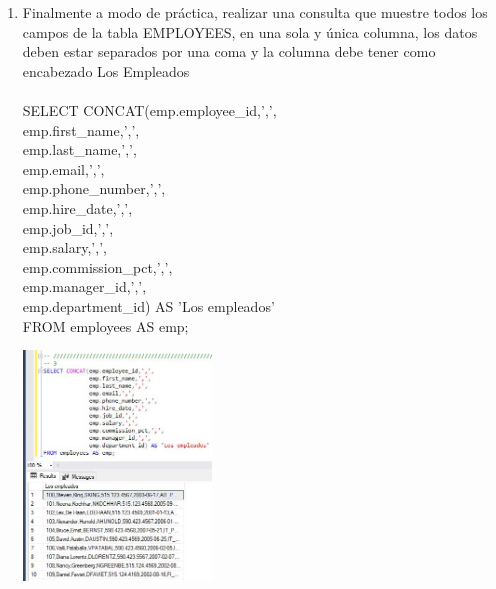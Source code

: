 \begin{enumerate}[1.]
	\item  Finalmente a modo de práctica, realizar una consulta que muestre todos los campos de la tabla EMPLOYEES, en una sola y única columna, los datos deben estar separados por una coma y la columna debe tener como encabezado Los Empleados
	\\
	\\SELECT CONCAT(emp.employee\_id,',', \\
			  emp.first\_name,',', \\
			  emp.last\_name,',', \\
			  emp.email,',', \\
			  emp.phone\_number,',', \\
			  emp.hire\_date,',', \\
			  emp.job\_id,',', \\
			  emp.salary,',', \\
			  emp.commission\_pct,',', \\
			  emp.manager\_id,',', \\
			  emp.department\_id) AS 'Los empleados' \\
	FROM employees AS emp; \\
	\begin{center}
	\includegraphics[width=5cm]{./Imagenes/actividad0303} 
	\end{center}

\end{enumerate}



